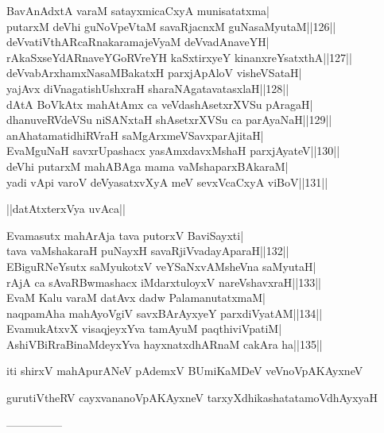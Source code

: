 \documentclass{article}
\begin{document}
BavAnAdxtA varaM satayxmicaCxyA munisatatxma|\\
putarxM deVhi guNoVpeVtaM savaRjacnxM guNasaMyutaM||126||\\
deVvatiVthARcaRnakaramajeVyaM deVvadAnaveYH|\\
rAkaSxseYdARnaveYGoRVreYH kaSxtirxyeY kinanxreYsatxthA||127||\\
deVvabArxhamxNasaMBakatxH parxjApAloV visheVSataH|\\
yajAvx diVnagatishUshxraH sharaNAgatavatasxlaH||128||\\
dAtA BoVkAtx mahAtAmx ca veVdashAsetxrXVSu pAragaH|\\
dhanuveRVdeVSu niSANxtaH shAsetxrXVSu ca parAyaNaH||129||\\
anAhatamatidhiRVraH saMgArxmeVSavxparAjitaH|\\
EvaMguNaH savxrUpashacx yasAmxdavxMshaH parxjAyateV||130||\\
deVhi putarxM mahABAga mama vaMshaparxBAkaraM|\\
yadi vApi varoV deVyasatxvXyA meV sevxVcaCxyA viBoV||131||\\

\begin{center}
||datAtxterxVya uvAca||
\end{center}

Evamasutx mahArAja tava putorxV BaviSayxti|\\
tava vaMshakaraH puNayxH savaRjiVvadayAparaH||132||\\
EBiguRNeYsutx saMyukotxV veYSaNxvAMsheVna saMyutaH|\\
rAjA ca sAvaRBwmashacx iMdarxtuloyxV nareVshavxraH||133||\\
EvaM Kalu varaM datAvx dadw PalamanutatxmaM|\\
naqpamAha mahAyoVgiV savxBArAyxyeY parxdiVyatAM||134||\\
EvamukAtxvX visaqjeyxYva tamAyuM paqthiviVpatiM|\\
AshiVBiRraBinaMdeyxYva hayxnatxdhARnaM cakAra ha||135||\\

\begin{center}
iti shirxV mahApurANeV pAdemxV BUmiKaMDeV veVnoVpAKAyxneV
\end{center}

\begin{center}
gurutiVtheRV cayxvananoVpAKAyxneV tarxyXdhikashatatamoVdhAyxyaH
\end{center}

\begin{center}
---------------
\end{center}
\end{document}
